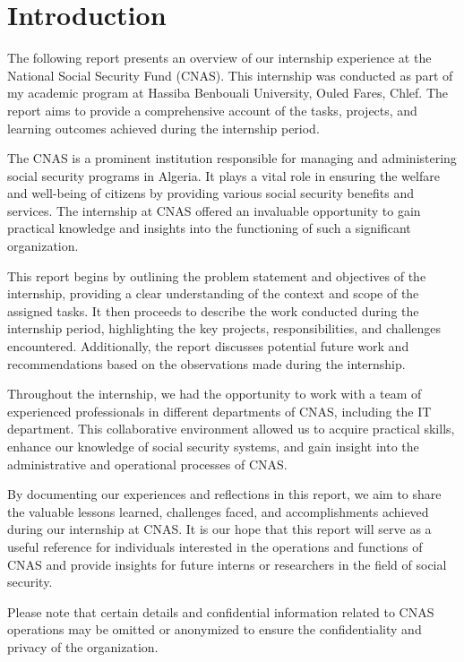 \chapter*{Introduction}
The following report presents an overview of our internship experience at the National Social Security Fund (CNAS). This internship was conducted as part of my academic program at Hassiba Benbouali University, Ouled Fares, Chlef. The report aims to provide a comprehensive account of the tasks, projects, and learning outcomes achieved during the internship period.

The CNAS is a prominent institution responsible for managing and administering social security programs in Algeria. It plays a vital role in ensuring the welfare and well-being of citizens by providing various social security benefits and services. The internship at CNAS offered an invaluable opportunity to gain practical knowledge and insights into the functioning of such a significant organization.

This report begins by outlining the problem statement and objectives of the internship, providing a clear understanding of the context and scope of the assigned tasks. It then proceeds to describe the work conducted during the internship period, highlighting the key projects, responsibilities, and challenges encountered. Additionally, the report discusses potential future work and recommendations based on the observations made during the internship.

Throughout the internship, we had the opportunity to work with a team of experienced professionals in different departments of CNAS, including the IT department. This collaborative environment allowed us to acquire practical skills, enhance our knowledge of social security systems, and gain insight into the administrative and operational processes of CNAS.

By documenting our experiences and reflections in this report, we aim to share the valuable lessons learned, challenges faced, and accomplishments achieved during our internship at CNAS. It is our hope that this report will serve as a useful reference for individuals interested in the operations and functions of CNAS and provide insights for future interns or researchers in the field of social security.

Please note that certain details and confidential information related to CNAS operations may be omitted or anonymized to ensure the confidentiality and privacy of the organization.

